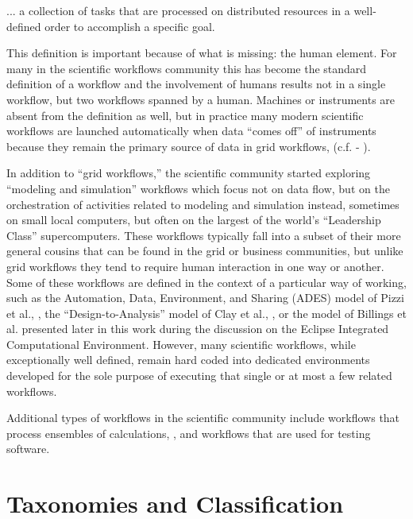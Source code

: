 \begin{displayquote}
... a collection of tasks that are processed on distributed resources in a
well-defined order to accomplish a specific goal.
\end{displayquote}

This definition is important because of what is missing: the human
element. For many in the scientific workflows community this has become
the standard definition of a workflow and the involvement of humans
results not in a single workflow, but two workflows spanned by a human.
Machines or instruments are absent from the definition as well, but in
practice many modern scientific workflows are launched automatically
when data ``comes off'' of instruments because they remain the primary
source of data in grid workflows, (c.f. - \cite{megino_panda:_2015}).

In addition to ``grid workflows,'' the scientific community started
exploring ``modeling and simulation'' workflows which focus not on data
flow, but on the orchestration of activities related to modeling and
simulation instead, sometimes on small local computers, but often on the
largest of the world's ``Leadership Class'' supercomputers. These
workflows typically fall into a subset of their more general cousins
that can be found in the grid or business communities, but unlike grid
workflows they tend to require human interaction in one way or another.
Some of these workflows are defined in the context of a particular way
of working, such as the Automation, Data, Environment, and Sharing
(ADES) model of Pizzi et al., \cite{pizzi_aiida:_2016}, the
``Design-to-Analysis'' model of Clay et al., \cite{clay_incorporating_2015}, or
the model of Billings et al. presented later in this work during the
discussion on the Eclipse Integrated Computational Environment. However,
many scientific workflows, while exceptionally well defined, remain hard
coded into dedicated environments developed for the sole purpose of
executing that single or at most a few related workflows.

Additional types of workflows in the scientific community include
workflows that process ensembles of calculations, \cite{montoya_apex_2016},
and workflows that are used for testing software.

\section{Taxonomies and
Classification}\label{taxonomies-and-classification}

